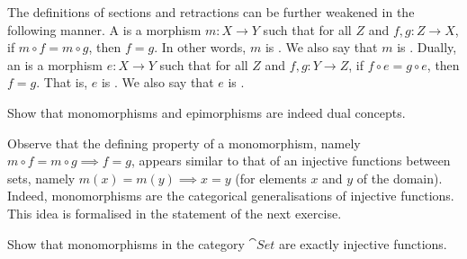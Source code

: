 The definitions of sections and retractions can be further weakened in the following manner. A  is a morphism $m \colon X \to Y$ such that for all $Z$ and $f, g \colon Z \to X$, if $m \circ f = m \circ g$, then $f = g$. In other words, $m$ is . We also say that $m$ is . Dually, an  is a morphism $e \colon X \to Y$ such that for all $Z$ and $f, g \colon Y \to Z$, if $f \circ e = g \circ e$, then $f = g$. That is, $e$ is . We also say that $e$ is .

\begin{Exercise}
Show that monomorphisms and epimorphisms are indeed dual concepts.
\end{Exercise}

Observe that the defining property of a monomorphism, namely $m \circ f = m \circ g \implies f = g$, appears similar to that of an injective functions between sets, namely $m(x) = m(y) \implies x = y$ (for elements $x$ and $y$ of the domain). Indeed, monomorphisms are the categorical generalisations of injective functions. This idea is formalised in the statement of the next exercise.

\begin{Exercise}
Show that monomorphisms in the category $\cat{Set}$ are exactly injective functions.
\end{Exercise}

